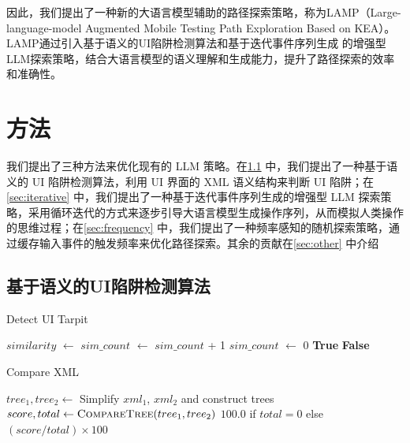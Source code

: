 \documentclass[twocolumn, 10pt]{article}
\newcommand{\kea}{K{\small\MakeUppercase{ea}}}
\newcommand{\lamp}{L{\small\MakeUppercase{amp}}}
\begin{document}
因此，我们提出了一种新的大语言模型辅助的路径探索策略，称为\lamp（Large-language-model Augmented Mobile Testing Path Exploration Based on \kea）。\lamp 通过引入基于语义的UI陷阱检测算法和基于迭代事件序列生成 的增强型LLM探索策略，结合大语言模型的语义理解和生成能力，提升了路径探索的效率和准确性。

\section{方法}

我们提出了三种方法来优化现有的 LLM 策略。在\textsection\ref{sec:semantic} 中，我们提出了一种基于语义的 UI 陷阱检测算法，利用 UI 界面的 XML 语义结构来判断 UI 陷阱；在\textsection\ref{sec:iterative} 中，我们提出了一种基于迭代事件序列生成的增强型 LLM 探索策略，采用循环迭代的方式来逐步引导大语言模型生成操作序列，从而模拟人类操作的思维过程；在\textsection\ref{sec:frequency} 中，我们提出了一种频率感知的随机探索策略，通过缓存输入事件的触发频率来优化路径探索。其余的贡献在\textsection\ref{sec:other} 中介绍

\subsection{基于语义的UI陷阱检测算法}
\label{sec:semantic}

\begin{algorithm}[t]
\caption{Detect UI Tarpit}
\label{alg:detect_tarpit}
\begin{algorithmic}[1]
    \State $similarity$ $\gets$ 
    \State $sim\_count$ $\gets$ $sim\_count$ + 1
        \State $sim\_count$ $\gets$ 0
        \State \Return \textbf{True}
    \EndIf
\EndIf
\State \Return \textbf{False}
\EndFunction
\end{algorithmic}
\end{algorithm}

\begin{algorithm}[t]
\caption{Compare XML}
\label{alg:compare_xml}
\begin{algorithmic}[1]
    \State $tree_1, tree_2 \gets$ Simplify $xml_1$, $xml_2$ and construct trees
    \State $score, total \gets \Call{CompareTree}{tree_1, tree_2}$
    \State \Return $100.0$ if $total = 0$ else $(score / total) \times 100$
\EndFunction
\end{algorithmic}
\end{algorithm}
\end{document}
